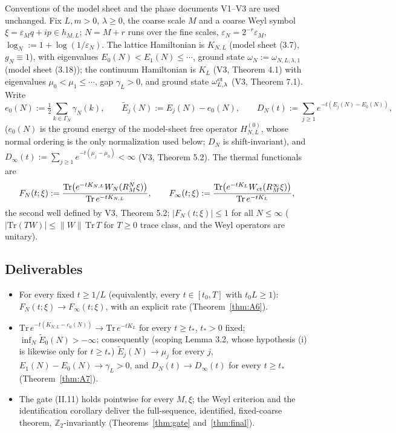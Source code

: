 \documentclass[11pt,a4paper]{article}
\theoremstyle{plain}
\theoremstyle{definition}
\newcommand{\Z}{\mathbb{Z}}
\newcommand{\eps}{\varepsilon}
\newcommand{\Trace}{\mathrm{Tr}}
\newcommand{\logN}{\log_N}
\begin{document}
Conventions of the model sheet and the phase documents V1--V3 are used
unchanged. Fix $L,m>0$, $\lambda\ge0$, the coarse scale $M$ and a coarse
Weyl symbol $\xi=\eps_Mq+ip\in h_{M,L}$; $N=M+r$ runs over the fine
scales, $\eps_N=2^{-r}\eps_M$, $\logN:=1+\log(1/\eps_N)$. The lattice
Hamiltonian is $K_{N,L}$ (model sheet (3.7), $g_N\equiv1$), with
eigenvalues $E_0(N)<E_1(N)\le\cdots$, ground state
$\omega_N:=\omega_{N,L,\lambda,1}$ (model sheet (3.18)); the continuum
Hamiltonian is $K_L$ (V3, Theorem 4.1) with eigenvalues
$\mu_0<\mu_1\le\cdots$, gap $\gamma_L>0$, and ground state
$\omega^{\rm ct}_{L,\lambda}$ (V3, Theorem 7.1). Write
\[
 e_0(N):=\tfrac12\sum_{k\in\Gamma_N}\gamma_N(k),
 \qquad
 \widetilde E_j(N):=E_j(N)-e_0(N),
 \qquad
 D_N(t):=\sum_{j\ge1}e^{-t(E_j(N)-E_0(N))},
\]
($e_0(N)$ is the ground energy of the model-sheet free operator
$H^{(0)}_{N,L}$, whose normal ordering is the only normalization used
below; $D_N$ is shift-invariant), and $D_\infty(t):=\sum_{j\ge1}
e^{-t(\mu_j-\mu_0)}<\infty$ (V3, Theorem 5.2). The thermal functionals
are
\begin{equation}
 F_N(t;\xi):=\frac{\Trace\bigl(e^{-tK_{N,L}}W_N(R_M^N\xi)\bigr)}
 {\Trace\,e^{-tK_{N,L}}},
 \qquad
 F_\infty(t;\xi):=\frac{\Trace\bigl(e^{-tK_L}W_{\rm ct}(R_M^\infty\xi)
 \bigr)}{\Trace\,e^{-tK_L}},
 \label{eq:thermal}
\end{equation}
the second well defined by V3, Theorem 5.2; $|F_N(t;\xi)|\le1$ for all
$N\le\infty$ ($|\Trace(TW)|\le\|W\|\,\Trace\,T$ for $T\ge0$ trace class,
and the Weyl operators are unitary).

\subsection{Deliverables}

\begin{itemize}
\item[(A6)] For every fixed $t\ge1/L$ (equivalently, every $t\in[t_0,T]$ with
$t_0L\ge1$): $F_N(t;\xi)\to F_\infty(t;\xi)$, with an explicit rate
(Theorem~\ref{thm:A6}).
\item[(A7)] $\Trace\,e^{-t(K_{N,L}-e_0(N))}\to\Trace\,e^{-tK_L}$ for every
$t\ge t_*$, $t_*>0$ fixed; $\inf_N\widetilde E_0(N)>-\infty$; consequently
(scoping Lemma 3.2, whose hypothesis (i) is likewise only for $t\ge t_*$)
$\widetilde E_j(N)\to\mu_j$ for every $j$, $E_1(N)-E_0(N)\to
\gamma_L>0$, and $D_N(t)\to D_\infty(t)$ for every $t\ge t_*$
(Theorem~\ref{thm:A7}).
\item[(A8)] The gate (II.11) holds pointwise for every $M,\xi$; the Weyl
criterion and the identification corollary deliver the full-sequence,
identified, fixed-coarse theorem, $\Z_2$-invariantly
(Theorems~\ref{thm:gate} and~\ref{thm:final}).
\end{itemize}
\end{document}
